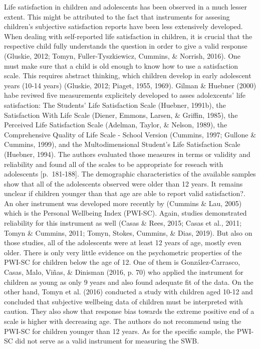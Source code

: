 \documentclass[a4, 12pt]{article}
\begin{document}
Life satisfaction in children and adolescents has been observed in a much lesser extent. This might be attributed to the fact that instruments for assesing children's subjective satisfaction reports have been less extensively developed. When dealing with self-reported life satisfaction in children, it is crucial that the respective child fully understands the question in order to give a valid response (Gluskie, 2012; Tomyn, Fuller-Tyszkiewicz, Cummins, \& Norrish, 2016). One must make sure that a child is old enough to know how to use a satisfaction scale. This requires abstract thinking, which children develop in early adolescent years (10-14 years) (Gluskie, 2012; Piaget, 1955, 1969). Gilman \& Huebner (2000) habe reviwed five measurements explicitely developed to asses adolexcents' life satisfaction: The Students' Life Satisfaction Scale (Huebner, 1991b), the Satisfaction With Life Scale (Diener, Emmons, Larsen, \& Griffin, 1985), the Perceived Life Satisfaction Scale (Adelman, Taylor, \& Nelson, 1989), the Comprehensive Quality of Life Scale - School Version (Cummins, 1997; Gullone \& Cummins, 1999), and the Multodimensional Student's Life Satisfaction Scale (Huebner, 1994). The authors evaluated those measures in terms or validity and reliability and found all of the scales to be appropriate for reseach with adolescents {[}p.~181-188{]}. The demographic characteristics of the available samples show that all of the adolescents observed were older than 12 years. It remains unclear if children younger than that age are able to report valid satisfaction?.
An oher instrument was developed more recently by (Cummins \& Lau, 2005) which is the Personal Wellbeing Index (PWI-SC). Again, studies demonstrated reliability for this instrument as well (Casas \& Rees, 2015; Casas et al., 2011; Tomyn \& Cummins, 2011; Tomyn, Stokes, Cummins, \& Dias, 2019). But also on those studies, all of the adolescents were at least 12 years of age, mostly even older. There is only very little evidence on the psychometric properties of the PWI-SC for children below the age of 12.
One of them is González-Carrasco, Casas, Malo, Viñas, \& Dinisman (2016, p. 70) who applied the instrument for children as young as only 9 years and also found adequate fit of the data.
On the other hand, Tomyn et al. (2016) conducted a study with children aged 10-12 and concluded that subjective wellbeing data of children must be interpreted with caution. They also show that response bias towards the extreme positive end of a scale is higher with decreasing age. The authors do not recommend using the PWI-SC for children younger than 12 years. As for the specific sample, the PWI-SC did not serve as a valid instrument for measuring the SWB.
\end{document}
